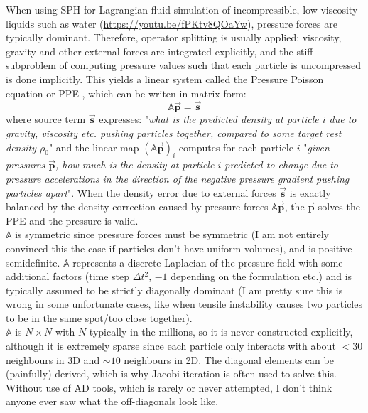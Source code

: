 \documentclass[oneside, a4paper]{book}
\newcommand\vek[1]{\vec{\bm{#1}}}
\newcommand\mat[1]{{\mathds{#1}}}
\newcommand\br[1]{\left(#1\right)}
\begin{document}
When using SPH for Lagrangian fluid simulation of incompressible, low-viscosity liquids such as water (\url{https://youtu.be/fPKtv8QOaYw}), pressure forces are typically dominant. Therefore, operator splitting is usually applied: viscosity, gravity and other external forces are integrated explicitly, and the stiff subproblem of computing pressure values such that each particle is uncompressed is done implicitly. This yields a linear system called the Pressure Poisson equation or PPE \autocite{tutorial2022}, which can be writen in matrix form:
\begin{equation}
    \mat{A}\vek{p} = \vek{s}
\end{equation}
where source term $\vek{s}$ expresses: "\textit{what is the predicted density at particle $i$ due to gravity, viscosity etc. pushing particles together, compared to some target rest density $\rho_0$}" and the linear map $\br{\mat{A}\vek{p}}_i$ computes for each particle $i$ "\textit{given pressures $\vek{p}$, how much is the density at particle $i$ predicted to change due to pressure accelerations in the direction of the negative pressure gradient pushing particles apart}". When the density error due to external forces $\vek{s}$ is exactly balanced by the density correction caused by pressure forces $\mat{A}\vek{p}$, the $\vek{p}$ solves the PPE and the pressure is valid.\\

$\mat{A}$ is symmetric since pressure forces must be symmetric (I am not entirely convinced this the case if particles don't have uniform volumes), and is positive semidefinite. $\mat{A}$ represents a discrete Laplacian of the pressure field with some additional factors (time step $\Delta t^2$, $-1$ depending on the formulation etc.) and is typically assumed to be strictly diagonally dominant (I am pretty sure this is wrong in some unfortunate cases, like when tensile instability causes two particles to be in the same spot/too close together).\\

$\mat{A}$ is $N\times N$ with $N$ typically in the millions, so it is never constructed explicitly, although it is extremely sparse since each particle only interacts with about $<30$ neighbours in 3D and $\sim 10$ neighbours in 2D. The diagonal elements can be (painfully) derived, which is why Jacobi iteration is often used to solve this.  Without use of AD tools, which is rarely or never attempted, I don't think anyone ever saw what the off-diagonals look like.


\end{document}
